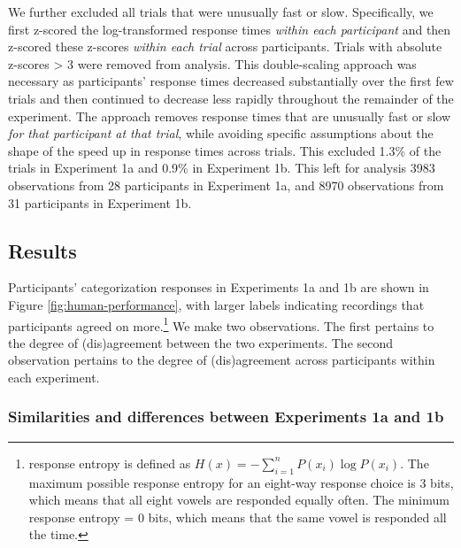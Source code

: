 \documentclass[preprint]{JASA}
\begin{document}
We further excluded all trials that were unusually fast or slow. Specifically, we first z-scored the log-transformed response times \emph{within each participant} and then z-scored these z-scores \emph{within each trial} across participants. Trials with absolute z-scores \textgreater{} 3 were removed from analysis. This double-scaling approach was necessary as participants' response times decreased substantially over the first few trials and then continued to decrease less rapidly throughout the remainder of the experiment. The approach removes response times that are unusually fast or slow \emph{for that participant at that trial}, while avoiding specific assumptions about the shape of the speed up in response times across trials. This excluded 1.3\% of the trials in Experiment 1a and 0.9\% in Experiment 1b. This left for analysis 3983 observations from 28 participants in Experiment 1a, and 8970 observations from 31 participants in Experiment 1b.

\subsection{Results}\label{sec:experiment-results}

Participants' categorization responses in Experiments 1a and 1b are shown in Figure \ref{fig:human-performance}, with larger labels indicating recordings that participants agreed on more.\footnote{\citet{shannon1948} response entropy is defined as \(H(x) = -\sum_{i=1}^{n} P(x_{i}) \log P(x_{i})\). The maximum possible response entropy for an eight-way response choice is 3 bits, which means that all eight vowels are responded equally often. The minimum response entropy = 0 bits, which means that the same vowel is responded all the time.} We make two observations. The first pertains to the degree of (dis)agreement between the two experiments. The second observation pertains to the degree of (dis)agreement across participants within each experiment.

\subsubsection{Similarities and differences between Experiments 1a and 1b}\label{similarities-and-differences-between-experiments-1a-and-1b}
\end{document}
